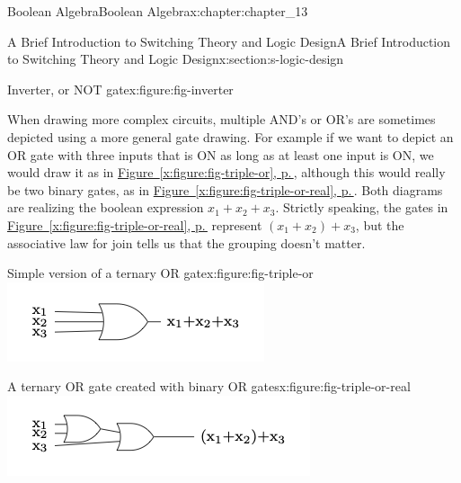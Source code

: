 \documentclass[twoside,10pt,]{book}
\newcommand{\xreffont}{\relax}
\numberwithin{equation}{section}
\begin{document}
\begin{chapterptx}{Boolean Algebra}{}{Boolean Algebra}{}{}{x:chapter:chapter_13}
\begin{sectionptx}{A Brief Introduction to Switching Theory and Logic Design}{}{A Brief Introduction to Switching Theory and Logic Design}{}{}{x:section:s-logic-design}
\begin{sidebyside}{2}{0}{0}{0}
\begin{sbspanel}{0.5}
\begin{figureptx}{Inverter, or NOT gate}{x:figure:fig-inverter}{}
\tcblower
\end{figureptx}%
\end{sbspanel}%
\end{sidebyside}%
\par
When drawing more complex circuits, multiple AND's or OR's are sometimes depicted using a more general gate drawing. For example if we want to depict an OR gate with three inputs that is ON as long as at least one input is ON, we would draw it as in  \hyperref[x:figure:fig-triple-or]{Figure~{\xreffont\ref{x:figure:fig-triple-or}}, p.\,\pageref{x:figure:fig-triple-or}}, although this would really be two binary gates, as in  \hyperref[x:figure:fig-triple-or-real]{Figure~{\xreffont\ref{x:figure:fig-triple-or-real}}, p.\,\pageref{x:figure:fig-triple-or-real}}. Both diagrams are realizing the boolean expression  \(x_1 + x_2 + x_3\). Strictly speaking, the gates in \hyperref[x:figure:fig-triple-or-real]{Figure~{\xreffont\ref{x:figure:fig-triple-or-real}}, p.\,\pageref{x:figure:fig-triple-or-real}} represent \((x_1 + x_2 )+ x_3\), but the associative law for join tells us that the grouping doesn't matter.%
\begin{sidebyside}{2}{0}{0}{0}%
\begin{sbspanel}{0.5}%
\begin{figureptx}{Simple version of a ternary OR gate}{x:figure:fig-triple-or}{}%
\includegraphics[width=\linewidth]{images/fig-triple-or.png}
\tcblower
\end{figureptx}%
\end{sbspanel}%
\begin{sbspanel}{0.5}%
\begin{figureptx}{A ternary OR gate created with binary OR gates}{x:figure:fig-triple-or-real}{}%
\includegraphics[width=\linewidth]{images/fig-triple-or-real.png}

\end{figureptx}
\end{sbspanel}
\end{sidebyside}
\end{sectionptx}
\end{chapterptx}
\end{document}
